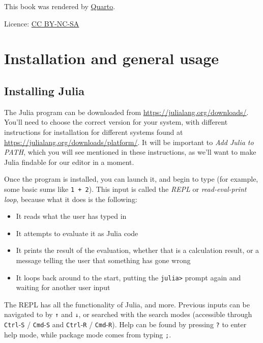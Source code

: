 \documentclass[
  letterpaper,
  DIV=11,
  numbers=noendperiod]{scrreprt}
\begin{document}
This book was rendered by \href{https://quarto.org/}{Quarto}.

Licence: \href{https://creativecommons.org/licenses/by-nc-sa/2.0/}{CC
BY-NC-SA}


\hypertarget{sec-installation}{%
\chapter{Installation and general usage}\label{sec-installation}}

\hypertarget{installing-julia}{%
\section{Installing Julia}\label{installing-julia}}

The Julia program can be downloaded from
\url{https://julialang.org/downloads/}. You'll need to choose the
correct version for your system, with different instructions for
installation for different systems found at
\url{https://julialang.org/downloads/platform/}. It will be important to
\emph{Add Julia to PATH}, which you will see mentioned in these
instructions, as we'll want to make Julia findable for our editor in a
moment.

Once the program is installed, you can launch it, and begin to type (for
example, some basic sums like \texttt{1\ +\ 2}). This input is called
the \emph{REPL} or \emph{read-eval-print loop}, because what it does is
the following:

\begin{itemize}
\item
  It reads what the user has typed in
\item
  It attempts to evaluate it as Julia code
\item
  It prints the result of the evaluation, whether that is a calculation
  result, or a message telling the user that something has gone wrong
\item
  It loops back around to the start, putting the
  \texttt{julia\textgreater{}} prompt again and waiting for another user
  input
\end{itemize}

The REPL has all the functionality of Julia, and more. Previous inputs
can be navigated to by \texttt{↑} and \texttt{↓}, or searched with the
search modes (accessible through \texttt{Ctrl}-\texttt{S} /
\texttt{Cmd}-\texttt{S} and \texttt{Ctrl}-\texttt{R} /
\texttt{Cmd}-\texttt{R}). Help can be found by pressing \texttt{?} to
enter help mode, while package mode comes from typing \texttt{;}.
\end{document}
